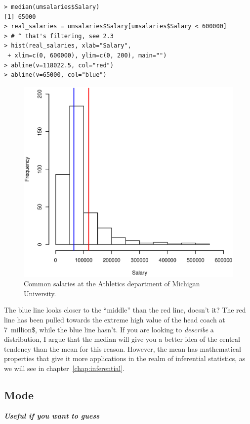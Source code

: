 \documentclass{report}
\newcommand{\notefor}[1]{\hfill\textbf{\textit{#1}}}
\begin{document}
		\begin{verbatim}
> median(umsalaries$Salary)
[1] 65000
> real_salaries = umsalaries$Salary[umsalaries$Salary < 600000]
> # ^ that's filtering, see 2.3
> hist(real_salaries, xlab="Salary", 
 + xlim=c(0, 600000), ylim=c(0, 200), main="")
> abline(v=118022.5, col="red")
> abline(v=65000, col="blue")
		\end{verbatim}
		
		\begin{figure}[h]
			\centering
			\includegraphics[width=1.0\textwidth]{median.eps}
			\caption{Common salaries at the Athletics department of Michigan University.}
			\label{fig:median}
		\end{figure}
	
		The blue line looks closer to the ``middle'' than the red line, doesn't it? The red line has been pulled towards the extreme high value of the head coach at 7~million\$, while the blue line hasn't. If you are looking to \emph{describe} a distribution, I argue that the median will give you a better idea of the central tendency than the mean for this reason. However, the mean has mathematical properties that give it more applications in the realm of inferential statistics, as we will see in chapter~\ref{chap:inferential}.
	
		\subsection{Mode}
		\notefor{Useful if you want to guess}
		
\end{document}
